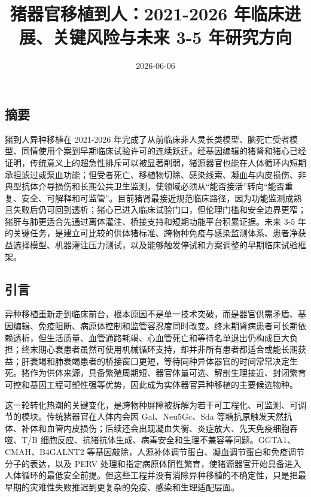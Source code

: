 \documentclass[
  chinese,
  11pt,a4paper]{article}
\title{猪器官移植到人：2021-2026 年临床进展、关键风险与未来 3-5
年研究方向}
\author{}
\date{2026-06-06}
\begin{document}
\maketitle

\subsection{摘要}\label{ux6458ux8981}

猪到人异种移植在 2021-2026
年完成了从前临床非人灵长类模型、脑死亡受者模型、同情使用个案到早期临床试验许可的连续跃迁。经基因编辑的猪肾和猪心已经证明，传统意义上的超急性排斥可以被显著削弱，猪源器官也能在人体循环内短期承担滤过或泵血功能；但受者死亡、移植物切除、感染线索、凝血与内皮损伤、非典型抗体介导损伤和长期公共卫生监测，使领域必须从``能否接活''转向``能否重复、安全、可解释和可监管''。目前猪肾最接近规范临床路径，因为功能监测成熟且失败后仍可回到透析；猪心已进入临床试验门口，但伦理门槛和安全边界更窄；猪肝与肺更适合先通过离体灌注、桥接支持和短期功能平台积累证据。未来
3-5
年的关键任务，是建立可比较的供体猪标准、跨物种免疫与感染监测体系、患者净获益选择模型、机器灌注压力测试，以及能够触发停试和方案调整的早期临床试验框架。

\subsection{引言}\label{ux5f15ux8a00}

异种移植重新走到临床前台，根本原因不是单一技术突破，而是器官供需矛盾、基因编辑、免疫阻断、病原体控制和监管容忍度同时改变。终末期肾病患者可长期依赖透析，但生活质量、血管通路耗竭、心血管死亡和等待名单退出仍构成巨大负担；终末期心衰患者虽然可使用机械循环支持，却并非所有患者都适合或能长期获益；肝衰竭和肺衰竭患者的桥接窗口更短，等待同种异体器官的时间常常决定生死。猪作为供体来源，具备繁殖周期短、器官体量可选、解剖生理接近、封闭繁育可控和基因工程可塑性强等优势，因此成为实体器官异种移植的主要候选物种\citep{physiologicalbasisfor2024, geneticengineeringof2022}。

这一轮转化热潮的关键变化，是跨物种屏障被拆解为若干可工程化、可监测、可调节的模块。传统猪器官在人体内会因
Gal、Neu5Gc、Sda
等糖抗原触发天然抗体、补体和血管内皮损伤；后续还会出现凝血失衡、炎症放大、先天免疫细胞吞噬、T/B
细胞反应、抗猪抗体生成、病毒安全和生理不兼容等问题。GGTA1、CMAH、B4GALNT2
等基因敲除，人源补体调节蛋白、凝血调节蛋白和免疫调节分子的表达，以及
PERV
处理和指定病原体阴性繁育，使猪源器官开始具备进入人体循环的最低安全前提\citep{whatgeneticmodifications2024, geneticallymodifiedpigs2025, specificpathogenfree20251}。但这些工程并没有消除异种移植的不确定性，只是把最早期的灾难性失败推迟到更复杂的免疫、感染和生理适配层面。
\end{document}
